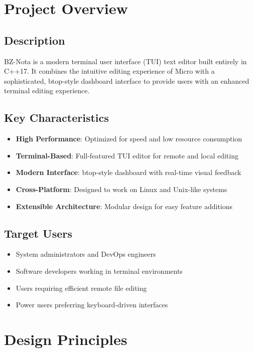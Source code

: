 \documentclass[12pt,a4paper,oneside,openany]{report}
\begin{document}
\section{Project Overview}

\subsection{Description}

BZ-Nota is a modern terminal user interface (TUI) text editor built entirely in C++17. It combines the intuitive editing experience of Micro with a sophisticated, btop-style dashboard interface to provide users with an enhanced terminal editing experience.

\subsection{Key Characteristics}

\begin{itemize}
	\item \textbf{High Performance}: Optimized for speed and low resource consumption
	\item \textbf{Terminal-Based}: Full-featured TUI editor for remote and local editing
	\item \textbf{Modern Interface}: btop-style dashboard with real-time visual feedback
	\item \textbf{Cross-Platform}: Designed to work on Linux and Unix-like systems
	\item \textbf{Extensible Architecture}: Modular design for easy feature additions
\end{itemize}

\subsection{Target Users}

\begin{itemize}
	\item System administrators and DevOps engineers
	\item Software developers working in terminal environments
	\item Users requiring efficient remote file editing
	\item Power users preferring keyboard-driven interfaces
\end{itemize}

\section{Design Principles}
\end{document}
